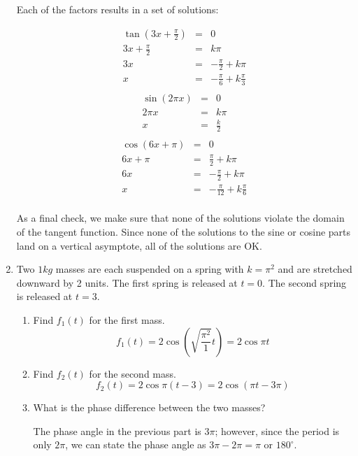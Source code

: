 \documentclass[letterpaper,12pt,fleqn]{article}
\begin{document}
\begin{enumerate}
Each of the factors results in a set of solutions:

\begin{eqnarray*}
  \tan\left(3x+\frac{\pi}{2}\right) &=& 0 \\
  3x+\frac{\pi}{2} &=& k\pi \\
  3x &=& -\frac{\pi}{2}+k\pi \\
  x &=& -\frac{\pi}{6}+k\frac{\pi}{3} \\
\end{eqnarray*}
\begin{eqnarray*}
  \sin(2\pi x) &=& 0 \\
  2\pi x &=& k\pi \\
  x &=& \frac{k}{2} \\
\end{eqnarray*}
\begin{eqnarray*}
  \cos(6x+\pi) &=& 0 \\
  6x+\pi &=& \frac{\pi}{2}+k\pi \\
  6x &=& -\frac{\pi}{2}+k\pi \\
  x &=& -\frac{\pi}{12}+k\frac{\pi}{6} \\
\end{eqnarray*}

As a final check, we make sure that none of the solutions violate the domain
of the tangent function. Since none of the solutions to the sine or cosine
parts land on a vertical asymptote, all of the solutions are OK.

\bigskip

\item Two $1kg$ masses are each suspended on a spring with $k=\pi^2$ and are
stretched downward by 2 units. The first spring is released at $t=0$. The
second spring is released at $t=3$.
\begin{enumerate}
\item Find $f_1(t)$ for the first mass.
  \[f_1(t)=2\cos\left(\sqrt{\frac{\pi^2}{1}}t\right)=2\cos\pi t\]
  
\item Find $f_2(t)$ for the second mass.
  \[f_2(t)=2\cos\pi(t-3)=2\cos(\pi t-3\pi)\]

\item What is the phase difference between the two masses?

  The phase angle in the previous part is $3\pi$; however, since the period is
  only $2\pi$, we can state the phase angle as $3\pi-2\pi=\pi$ or $180^{\circ}$.
\end{enumerate}


\end{enumerate}
\end{document}
